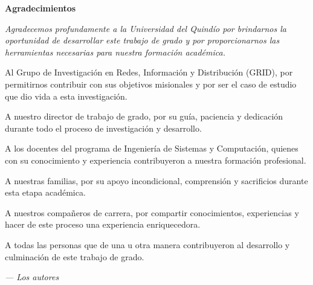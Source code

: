 \cleardoublepage%
%
\thispagestyle{empty}

\vspace*{\fill} %

\begin{center}
{\Large\bfseries Agradecimientos}
\end{center}

\vspace{2cm}

{\centering
{\itshape
Agradecemos profundamente a la Universidad del Quindío por brindarnos la oportunidad de desarrollar este trabajo de grado y por proporcionarnos las herramientas necesarias para nuestra formación académica.

Al Grupo de Investigación en Redes, Información y Distribución (GRID), por permitirnos contribuir con sus objetivos misionales y por ser el caso de estudio que dio vida a esta investigación.

A nuestro director de trabajo de grado, por su guía, paciencia y dedicación durante todo el proceso de investigación y desarrollo.

A los docentes del programa de Ingeniería de Sistemas y Computación, quienes con su conocimiento y experiencia contribuyeron a nuestra formación profesional.

A nuestras familias, por su apoyo incondicional, comprensión y sacrificios durante esta etapa académica.

A nuestros compañeros de carrera, por compartir conocimientos, experiencias y hacer de este proceso una experiencia enriquecedora.

A todas las personas que de una u otra manera contribuyeron al desarrollo y culminación de este trabajo de grado.
}

\vspace{2cm}

\hfill \textit{--- Los autores}

}

\vspace*{\fill} %